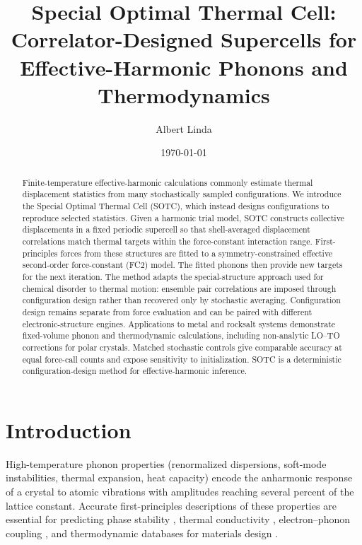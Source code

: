 \documentclass[aps,prb,reprint,amsmath,amssymb,floatfix]{revtex4-2}
\begin{document}
\title{Special Optimal Thermal Cell: Correlator-Designed Supercells for Effective-Harmonic Phonons and Thermodynamics}

\author{Albert Linda}

\date{\today}

\begin{abstract}

\color{revisionblue}
Finite-temperature effective-harmonic calculations commonly estimate thermal
displacement statistics from many stochastically sampled configurations. We
introduce the Special Optimal Thermal Cell (SOTC), which instead designs
configurations to reproduce selected statistics. Given a harmonic trial model,
SOTC constructs collective displacements in a fixed periodic supercell so that
shell-averaged displacement correlations match thermal targets within the
force-constant interaction range. First-principles forces from these structures
are fitted to a symmetry-constrained effective second-order force-constant
(FC2) model. The fitted phonons then provide new targets for the next iteration.
The method adapts the special-structure approach used for chemical disorder to
thermal motion: ensemble pair correlations are imposed through configuration
design rather than recovered only by stochastic averaging. Configuration design
remains separate from force evaluation and can be paired with different
electronic-structure engines. Applications to metal and rocksalt systems
demonstrate fixed-volume phonon and thermodynamic calculations, including
non-analytic LO--TO corrections for polar crystals. Matched stochastic controls
give comparable accuracy at equal force-call counts and expose sensitivity to
initialization. SOTC is a deterministic configuration-design method for
effective-harmonic inference.
\color{black}

\end{abstract}

\maketitle

\section{Introduction}\label{introduction}

High-temperature phonon properties (renormalized dispersions, soft-mode
instabilities, thermal expansion, heat capacity) encode the anharmonic
response of a crystal to atomic vibrations with amplitudes reaching
several percent of the lattice constant. Accurate first-principles
descriptions of these properties are essential for predicting phase
stability \cite{ref1}, thermal conductivity \cite{ref2},
electron--phonon coupling \cite{ref3}, and thermodynamic databases for
materials design \cite{ref4}.
\end{document}
